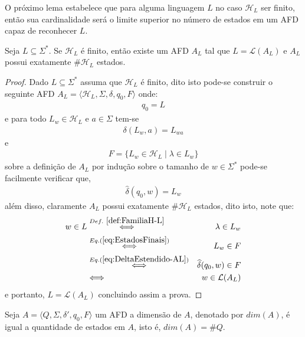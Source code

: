 O próximo lema estabelece que para alguma linguagem $L$ no caso $\mathcal{H}_L$ ser finito, então sua cardinalidade será o limite superior no número de estados em um AFD capaz de reconhecer $L$.

\begin{lema}\label{lema:LimiteSuperiorEstados}
	Seja $L \subseteq \Sigma^*$. Se $\mathcal{H}_L$ é finito, então existe um AFD $A _L$ tal que $L = \mathcal{L}(A_L)$ e $A_L$ possui exatamente $\#\mathcal{H}_L$ estados.
\end{lema}

\begin{proof}
	Dado $L \subseteq \Sigma^*$ assuma que $\mathcal{H}_L$ é finito, dito isto pode-se construir o seguinte AFD $A_L = \langle \mathcal{H}_L, \Sigma, \delta, q_0, F \rangle$ onde:
	\begin{eqnarray}\label{eq:EstadoInicial}
		q_0 = L
	\end{eqnarray}
	e para todo $L_w \in \mathcal{H}_L$ e $a \in \Sigma$ tem-se
	\begin{eqnarray}\label{eq:Delta-AL}
		\delta(L_w, a) = L_{wa}
	\end{eqnarray}
	e
	\begin{eqnarray}\label{eq:EstadosFinais}
		F = \{L_w \in \mathcal{H}_L \mid \lambda \in L_w\}
	\end{eqnarray}
	sobre a definição de $A_L$ por indução sobre o tamanho de $w \in \Sigma^*$ pode-se facilmente verificar que, 
	\begin{eqnarray}\label{eq:DeltaEstendido-AL}
		\widehat{\delta}(q_0, w) = L_w
	\end{eqnarray}
	além disso, claramente $A_L$ possui exatamente $\#\mathcal{H}_L$ estados, dito isto, note que:
	\begin{eqnarray*}
		w \in L & \stackrel{Def. \ \ref{def:FamiliaH-L}}{\Longleftrightarrow} & \lambda \in L_w\\
		& \stackrel{Eq. (\ref{eq:EstadosFinais})}{\Longleftrightarrow} & L_w \in F\\
		& \stackrel{Eq. (\ref{eq:DeltaEstendido-AL})}{\Longleftrightarrow} & \widehat{\delta}(q_0, w) \in F\\
		& \Longleftrightarrow & w \in \mathcal{L}(A_L)
	\end{eqnarray*}
	e portanto, $L = \mathcal{L}(A_L)$ concluindo assim a prova.
\end{proof}

\begin{definition}
	Seja $A = \langle Q, \Sigma, \delta', q_0, F \rangle$ um AFD a dimensão de $A$, denotado por $dim(A)$, é igual a quantidade de estados em $A$, isto é, $dim(A) = \# Q$. 
\end{definition}

